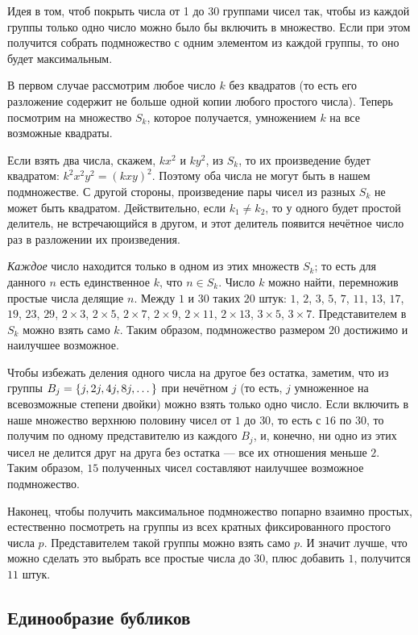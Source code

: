 Идея в том, чтоб покрыть числа от 1 до 30 группами чисел так, чтобы из каждой группы только одно число можно было бы включить в множество.
Если при этом получится собрать подмножество с одним элементом из каждой группы, то оно будет максимальным.

В первом случае рассмотрим любое число $k$ без квадратов (то есть его разложение содержит не больше одной копии любого простого числа).
Теперь посмотрим на множество $S_k$, которое получается, умножением $k$ на все возможные квадраты.

Если взять два числа, скажем, $kx^2$ и $ky^2$, из $S_k$, то их произведение будет квадратом: $k^2x^2y^2 = (kxy)^2$.
Поэтому оба числа не могут быть в нашем подмножестве.
С другой стороны, произведение пары чисел из разных $S_k$ не может быть квадратом.
Действительно, если $k_1\ne k_2$, то у одного будет простой делитель, не встречающийся в другом, и этот делитель появится нечётное число раз в разложении их произведения.

\emph{Каждое} число находится только в одном из этих множеств $S_k$;
то есть для данного $n$ есть единственное $k$, что $n \in S_k$.
Число $k$ можно найти, перемножив простые числа делящие $n$.
Между $1$ и $30$ таких $20$ штук: $1$, $2$, $3$, $5$, $7$, $11$, $13$, $17$, $19$,
$23$, $29$, $2 \times 3$, $2 \times 5$, $2 \times 7$, $2 \times 9$, $2 \times 11$, $2 \times 13$, $3 \times 5$, $3 \times 7$.
Представителем в $S_k$ можно взять само $k$.
Таким образом, подмножество размером $20$ достижимо и наилучшее возможное.

Чтобы избежать деления одного числа на другое без остатка, заметим, что из группы $B_j \z= \{j, 2j, 4j, 8j, \dots\}$ при нечётном $j$ (то есть, $j$ умноженное на всевозможные степени двойки) можно взять только одно число.
Если включить в наше множество верхнюю половину чисел от $1$ до $30$, то есть с $16$ по $30$, то получим по одному представителю из каждого $B_j$, и, конечно, ни одно из этих чисел не делится друг на друга без остатка --- все их отношения меньше $2$.
Таким образом, $15$ полученных чисел составляют наилучшее возможное подмножество.

Наконец, чтобы получить максимальное подмножество попарно взаимно простых, естественно посмотреть на группы из всех кратных фиксированного простого числа $p$.
Представителем такой группы можно взять само $p$. 
И значит лучше, что можно сделать это выбрать все простые числа до $30$, плюс добавить $1$, получится $11$ штук.

\subsection*{Единообразие бубликов}

